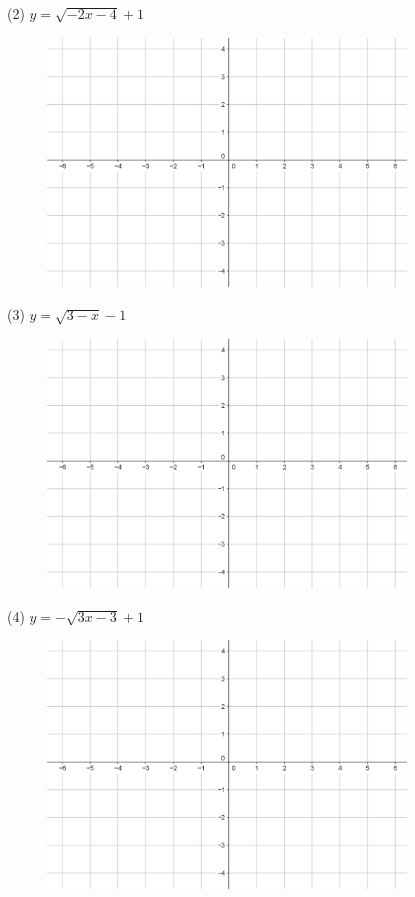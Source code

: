 \documentclass{article}
\begin{document}
(2) \(y=\sqrt{-2x-4}+1\)
\begin{figure}[h!]
\centering
\includegraphics[width=0.85\textwidth]{irr_2_5}
\end{figure}

\clearpage
(3) \(y=\sqrt{3-x}-1\)
\begin{figure}[h!]
\centering
\includegraphics[width=0.85\textwidth]{irr_2_5}
\end{figure}

(4) \(y=-\sqrt{3x-3}+1\)
\begin{figure}[h!]
\centering
\includegraphics[width=0.85\textwidth]{irr_2_5}
\end{figure}
\end{document}
